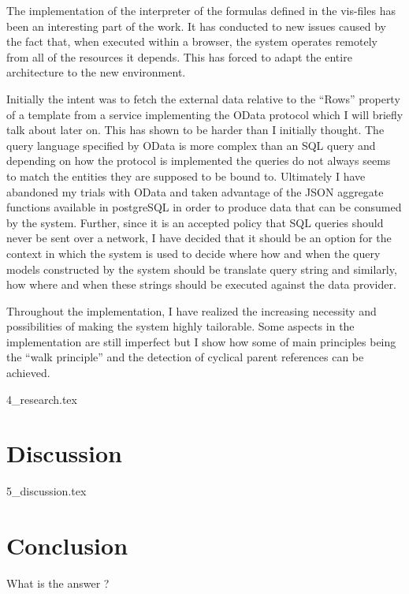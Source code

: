 \documentclass[12pt, paperA4]{article}
\begin{document}
The implementation of the interpreter of the formulas defined in the vis-files has been an interesting part of the work. It has conducted to new issues caused by the fact that, when executed within a browser, the system operates remotely from all of the resources it depends. This has forced to adapt the entire architecture to the new environment.

Initially the intent was to fetch the external data relative to the ``Rows'' property of a template from a service implementing the OData protocol which I will briefly talk about later on. This has shown to be harder than I initially thought. The query language specified by OData is more complex than an SQL query and depending on how the protocol is implemented the queries do not always seems to match the entities they are supposed to be bound to. Ultimately I have abandoned my trials with OData and taken advantage of the JSON aggregate functions available in postgreSQL in order to produce data that can be consumed by the system. Further, since it is an accepted policy that SQL queries should never be sent over a network, I have decided that it should be an option for the context in which the system is used to decide where how and when the query models constructed by the system should be translate query string and similarly, how where and when these strings should be executed against the data provider.

Throughout the implementation, I have realized the increasing necessity and possibilities of making the system highly tailorable. Some aspects in the implementation are still imperfect but I show how some of main principles being the ``walk principle'' and the detection of cyclical parent references can be achieved.

{4_research.tex}


\section{Discussion}
{5_discussion.tex}

\section{Conclusion}
What is the answer ?

\clearpage







\end{document}

